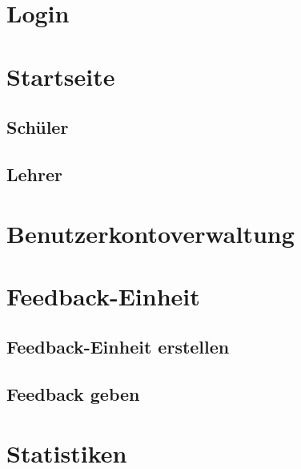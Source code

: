 \section{Login}

\section{Startseite}

\subsection{Schüler}
\subsection{Lehrer}

\section{Benutzerkontoverwaltung}

\section{Feedback-Einheit}
\subsection{Feedback-Einheit erstellen}
\subsection{Feedback geben}

\section{Statistiken}
